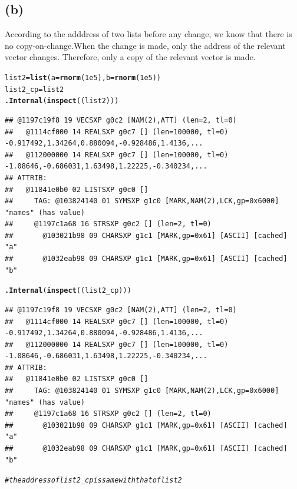 \documentclass{article}\usepackage[]{graphicx}\usepackage[]{color}
\makeatletter
\newcommand{\hlnum}[1]{\textcolor[rgb]{0.686,0.059,0.569}{#1}}%
\newcommand{\hlcom}[1]{\textcolor[rgb]{0.678,0.584,0.686}{\textit{#1}}}%
\newcommand{\hlstd}[1]{\textcolor[rgb]{0.345,0.345,0.345}{#1}}%
\newcommand{\hlkwb}[1]{\textcolor[rgb]{0.69,0.353,0.396}{#1}}%
\newcommand{\hlkwc}[1]{\textcolor[rgb]{0.333,0.667,0.333}{#1}}%
\newcommand{\hlkwd}[1]{\textcolor[rgb]{0.737,0.353,0.396}{\textbf{#1}}}%
\newenvironment{kframe}{%
 \def\at@end@of@kframe{}%
 \ifinner\ifhmode%
  \def\at@end@of@kframe{\end{minipage}}%
  \begin{minipage}{\columnwidth}%
 \fi\fi%
 \def\FrameCommand##1{\hskip\@totalleftmargin \hskip-\fboxsep
 \colorbox{shadecolor}{##1}\hskip-\fboxsep
     \hskip-\linewidth \hskip-\@totalleftmargin \hskip\columnwidth}%
 \MakeFramed {\advance\hsize-\width
   \@totalleftmargin\z@ \linewidth\hsize
   \@setminipage}}%
 {\par\unskip\endMakeFramed%
 \at@end@of@kframe}
\newenvironment{knitrout}{}{} %
\makeatother
\begin{document}
\subsection{(b)}
According to the adddress of two lists before any change, we know that there is no copy-on-change.When the change is made, only the address of the relevant vector changes. Therefore, only a copy of the relevant vector is made.
\begin{knitrout}
\color{fgcolor}\begin{kframe}
\begin{alltt}
\hlstd{list2}\hlkwb{=}\hlkwd{list}\hlstd{(}\hlkwc{a}\hlstd{=}\hlkwd{rnorm}\hlstd{(}\hlnum{1e5}\hlstd{),}\hlkwc{b}\hlstd{=}\hlkwd{rnorm}\hlstd{(}\hlnum{1e5}\hlstd{))}
\hlstd{list2_cp}\hlkwb{=}\hlstd{list2}
\hlkwd{.Internal}\hlstd{(}\hlkwd{inspect}\hlstd{((list2)))}
\end{alltt}
\begin{verbatim}
## @1197c19f8 19 VECSXP g0c2 [NAM(2),ATT] (len=2, tl=0)
##   @1114cf000 14 REALSXP g0c7 [] (len=100000, tl=0) -0.917492,1.34264,0.880094,-0.928486,1.4136,...
##   @112000000 14 REALSXP g0c7 [] (len=100000, tl=0) -1.08646,-0.686031,1.63498,1.22225,-0.340234,...
## ATTRIB:
##   @11841e0b0 02 LISTSXP g0c0 [] 
##     TAG: @103824140 01 SYMSXP g1c0 [MARK,NAM(2),LCK,gp=0x6000] "names" (has value)
##     @1197c1a68 16 STRSXP g0c2 [] (len=2, tl=0)
##       @103021b98 09 CHARSXP g1c1 [MARK,gp=0x61] [ASCII] [cached] "a"
##       @1032eab98 09 CHARSXP g1c1 [MARK,gp=0x61] [ASCII] [cached] "b"
\end{verbatim}
\begin{alltt}
\hlkwd{.Internal}\hlstd{(}\hlkwd{inspect}\hlstd{((list2_cp)))}
\end{alltt}
\begin{verbatim}
## @1197c19f8 19 VECSXP g0c2 [NAM(2),ATT] (len=2, tl=0)
##   @1114cf000 14 REALSXP g0c7 [] (len=100000, tl=0) -0.917492,1.34264,0.880094,-0.928486,1.4136,...
##   @112000000 14 REALSXP g0c7 [] (len=100000, tl=0) -1.08646,-0.686031,1.63498,1.22225,-0.340234,...
## ATTRIB:
##   @11841e0b0 02 LISTSXP g0c0 [] 
##     TAG: @103824140 01 SYMSXP g1c0 [MARK,NAM(2),LCK,gp=0x6000] "names" (has value)
##     @1197c1a68 16 STRSXP g0c2 [] (len=2, tl=0)
##       @103021b98 09 CHARSXP g1c1 [MARK,gp=0x61] [ASCII] [cached] "a"
##       @1032eab98 09 CHARSXP g1c1 [MARK,gp=0x61] [ASCII] [cached] "b"
\end{verbatim}
\begin{alltt}
\hlcom{#the address of list2_cp is same with that of list2}

\end{alltt}
\end{kframe}
\end{knitrout}
\end{document}

